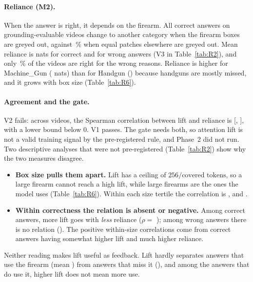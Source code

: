 \paragraph{Reliance (M2).} When the answer is right, it depends on the firearm. All  correct answers on grounding-evaluable videos change to another category when the firearm boxes are greyed out, against \,\% when equal patches elsewhere are greyed out. Mean reliance is  nats for correct and  for wrong answers (V3 in Table~\ref{tab:R2}), and only \,\% of the videos are right for the wrong reasons. Reliance is higher for Machine\_Gun ( nats) than for Handgun () because handguns are mostly missed, and it grows with box size (Table~\ref{tab:R6}).

\paragraph{Agreement and the gate.} V2 fails: across videos, the Spearman correlation between lift and reliance is  [, ], with a lower bound below 0. V1 passes. The gate needs both, so attention lift is not a valid training signal by the pre-registered rule, and Phase~2 did not run. Two descriptive analyses that were not pre-registered (Table~\ref{tab:R2}) show why the two measures disagree.
\begin{itemize}
\item \textbf{Box size pulls them apart.} Lift has a ceiling of $256/\text{covered tokens}$, so a large firearm cannot reach a high lift, while large firearms are the ones the model uses (Table~\ref{tab:R6}). Within each size tertile the correlation is ,  and .
\item \textbf{Within correctness the relation is absent or negative.} Among correct answers, more lift goes with \emph{less} reliance ($\rho=$ ); among wrong answers there is no relation (). The positive within-size correlations come from correct answers having somewhat higher lift and much higher reliance.
\end{itemize}
Neither reading makes lift useful as feedback. Lift hardly separates answers that use the firearm (mean ) from answers that miss it (), and among the answers that do use it, higher lift does not mean more use.

